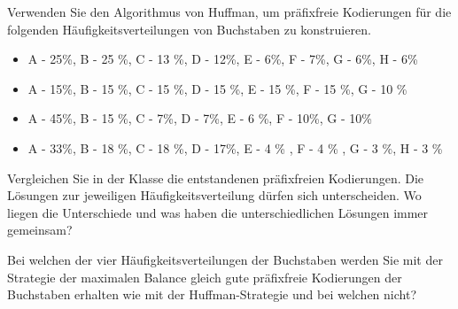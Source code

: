 \begin{myexercise}
Verwenden Sie den Algorithmus von Huffman, um präfixfreie Kodierungen für die folgenden Häufigkeitsverteilungen von Buchstaben zu konstruieren.
\begin{itemize}
\item A - 25\%, B - 25 \%, C - 13 \%, D - 12\%, E - 6\%, F - 7\%, G - 6\%, H - 6\%
\item A - 15\%, B - 15 \%, C - 15 \%, D - 15 \%, E - 15 \%, F - 15 \%, G - 10 \%
\item A - 45\%, B - 15 \%, C - 7\%, D - 7\%, E - 6 \%, F - 10\%, G - 10\%
\item A - 33\%, B - 18 \%, C - 18 \%, D - 17\%, E - 4 \% , F - 4 \% , G - 3 \%, H - 3 \%
\end{itemize}
Vergleichen Sie in der Klasse die entstandenen präfixfreien Kodierungen. Die Lösungen
zur jeweiligen Häufigkeitsverteilung dürfen sich unterscheiden. Wo liegen die Unterschiede
und was haben die unterschiedlichen Lösungen immer gemeinsam?

Bei welchen der vier Häufigkeitsverteilungen der Buchstaben werden Sie mit der Strategie
der maximalen Balance gleich gute präfixfreie Kodierungen der Buchstaben erhalten wie mit der  Huffman-Strategie und bei welchen nicht?
\end{myexercise}


